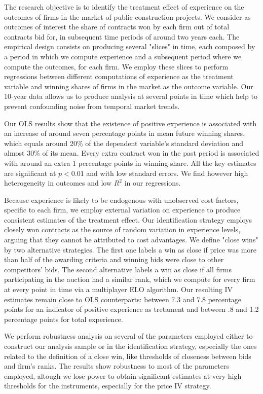  The research objective is to identify the treatment effect of experience on the outcomes of firms in the market of public construction projects. We consider as outcomes of interest the share of contracts won by each firm out of total contracts bid for, in subsequent time periods of around two years each. The empirical design consists on producing several "slices" in time, each composed by a period in which we compute experience and a subsequent period where we compute the outcomes, for each firm. We employ these slices to perform regressions between different computations of experience as the treatment variable and winning shares of firms in the market as the outcome variable. Our 10-year data allows us to produce analysis at several points in time which help to prevent confounding noise from temporal market trends.

Our OLS results show that the existence of positive experience is associated with an increase of around seven percentage points in mean future winning shares, which equals around 20\% of the dependent variable's standard deviation and almost 30\% of its mean. Every extra contract won in the past period is associated with around an extra 1 percentage points in winning share. All the key estimates are significant at $p<0.01$ and with low standard errors. We find however high heterogeneity in outcomes and low $R^2$ in our regressions.

 Because experience is likely to be endogenous with unobserved cost factors, specific to each firm, we employ external variation on experience to produce consistent estimates of the treatment effect. Our identification strategy employs closely won contracts as the source of random variation in experience levels, arguing that they cannot be attributed to cost advantages. We define "close wins" by two alternative strategies. The first one labels a win as close if price was more than half of the awarding criteria and winning bids were close to other competitors' bids. The second alternative labels a win as close if all firms participating in the auction had a similar rank, which we compute for every firm at every point in time via a multiplayer ELO algorithm. Our resulting IV estimates remain close to OLS counterparts: between 7.3 and 7.8 percentage points for an indicator of positive experience as tretament and between .8 and 1.2 percentage points for total experience.

 We perform robustness analysis on several of the parameters employed either to construct our analysis sample or in the identification strategy, especially the ones related to the definition of a close win, like thresholds of closeness between bids and firm's ranks. The results show robustness to most of the parameters employed, altough we lose power to obtain significant estimates at very high thresholds for the instruments, especially for the price IV strategy.

